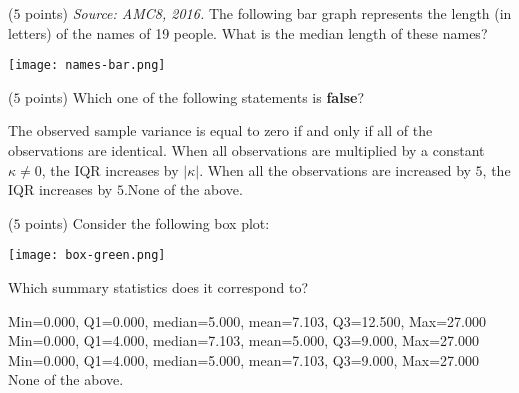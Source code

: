 \documentclass[reqno,letterpaper, onsided,10pt]{amsart}
\theoremstyle{definition}
\newcommand{\sol}[1]{\par\noindent{\bf Solution:} #1}
\renewcommand{\sol}[1]{}
\begin{document}
\sol{{\bf (b)}\\
The "hump" is on the right; see how the values "max-out" at $4$. So, it's left-skewed.
}

\medskip

\begin{problem} ($5$ points) %
{\em Source: AMC8, 2016.}
The following bar graph represents the length (in letters) of the names of 19 people. What is the median length of these names? 

\medskip

\texttt{[image: names-bar.png]}

\medskip

\end{problem}

\sol{{\bf (b)}\\
According to the bar graph, there is a total of $7+3+1+4+4=19$ names. The median name length is, thus, in the $10^{th}$ spot. This means it's of length $4$. 
}

\medskip

\begin{problem} ($5$ points) %
Which one of the following statements is {\bf false}?

{The observed sample variance is equal to zero if and only if all of
  the observations are identical.}
{When all observations are multiplied by a constant $\kappa\ne 0$, the IQR increases by $|\kappa|.$}
{When all the observations are increased by $5$, the IQR increases by $5$.}{None of the above.}
\end{problem}

\sol{{\bf d}\\
}

\medskip

\begin{problem} ($5$ points) %
Consider the following box plot:

\texttt{[image: box-green.png]}

Which summary statistics does it correspond to?

{Min=0.000, Q1=0.000, median=5.000, mean=7.103, Q3=12.500, Max=27.000}
{Min=0.000, Q1=4.000, median=7.103, mean=5.000, Q3=9.000, Max=27.000 }
{Min=0.000, Q1=4.000, median=5.000, mean=7.103, Q3=9.000, Max=27.000 }
{None of the above.}
\end{problem}
\end{document}
